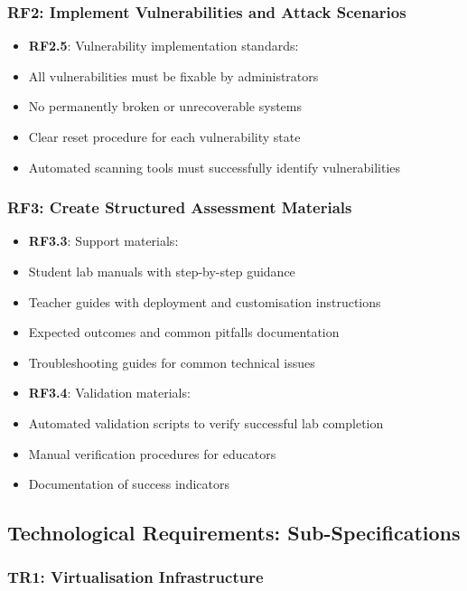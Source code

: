 \subsubsection{RF2: Implement Vulnerabilities and Attack Scenarios}

\begin{itemize}
\tightlist
\item
  \textbf{RF2.5}: Vulnerability implementation standards:
\item
  All vulnerabilities must be fixable by administrators
\item
  No permanently broken or unrecoverable systems
\item
  Clear reset procedure for each vulnerability state
\item
  Automated scanning tools must successfully identify vulnerabilities
\end{itemize}

\subsubsection{RF3: Create Structured Assessment Materials}

\begin{itemize}
\tightlist
\item
  \textbf{RF3.3}: Support materials:
\item
  Student lab manuals with step-by-step guidance
\item
  Teacher guides with deployment and customisation instructions
\item
  Expected outcomes and common pitfalls documentation
\item
  Troubleshooting guides for common technical issues
\item
  \textbf{RF3.4}: Validation materials:
\item
  Automated validation scripts to verify successful lab completion
\item
  Manual verification procedures for educators
\item
  Documentation of success indicators
\end{itemize}

\subsection{Technological Requirements: Sub-Specifications}

\subsubsection{TR1: Virtualisation Infrastructure}

